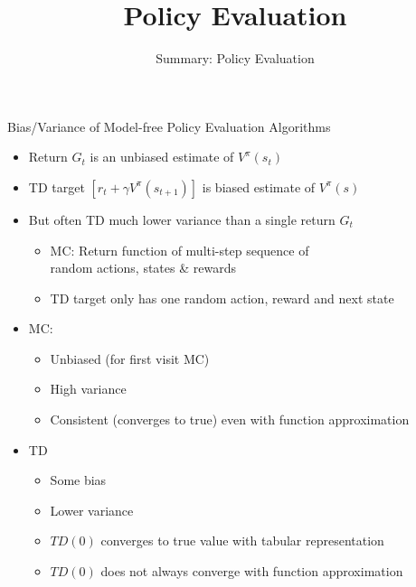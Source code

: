 


\title[Reinforcement Learning: Policy Evaluation]{Policy Evaluation}
\subtitle{Summary: Policy Evaluation}




	
	\maketitle

\begin{frame}[c]{Bias/Variance of Model-free Policy Evaluation Algorithms}

\begin{itemize}
	\item Return $G_t$ is an unbiased estimate of $V^\pi(s_t)$
	\item TD target $[r_t + \gamma V^\pi(s_{t+1})]$ is biased estimate of $V^\pi(s)$ 
	\item But often TD much lower variance than a single return $G_t$
	\begin{itemize}
		\item MC: Return function of multi-step sequence of \\ random actions, states \& rewards
		\item TD target only has one random action, reward and next state
	\end{itemize}
	\pause
	\item MC:
	\begin{itemize}
		\item Unbiased (for first visit MC)
		\item High variance
		\item Consistent (converges to true) even with function approximation
	\end{itemize}
	\pause
	\item TD
	\begin{itemize}
		\item Some bias
		\item Lower variance
		\item $TD(0)$ converges to true value with tabular representation
		\item $TD(0)$ does not always converge with function approximation 
	\end{itemize}
\end{itemize}
	
\end{frame}
